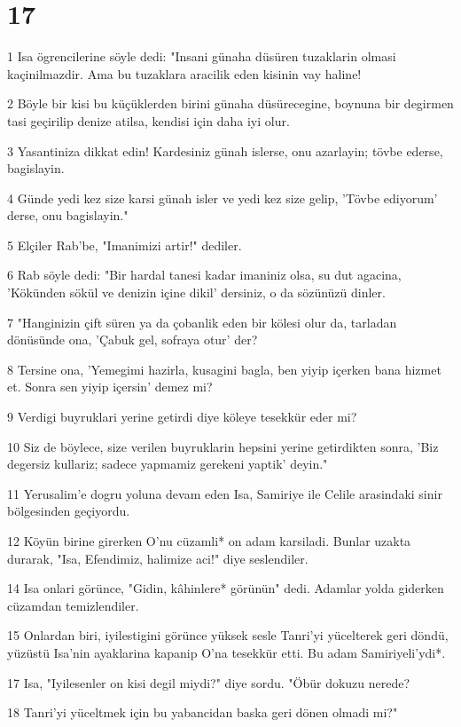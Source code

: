 \chapter{17}

\par 1 Isa ögrencilerine söyle dedi: "Insani günaha düsüren tuzaklarin olmasi kaçinilmazdir. Ama bu tuzaklara aracilik eden kisinin vay haline!
\par 2 Böyle bir kisi bu küçüklerden birini günaha düsürecegine, boynuna bir degirmen tasi geçirilip denize atilsa, kendisi için daha iyi olur.
\par 3 Yasantiniza dikkat edin! Kardesiniz günah islerse, onu azarlayin; tövbe ederse, bagislayin.
\par 4 Günde yedi kez size karsi günah isler ve yedi kez size gelip, 'Tövbe ediyorum' derse, onu bagislayin."
\par 5 Elçiler Rab'be, "Imanimizi artir!" dediler.
\par 6 Rab söyle dedi: "Bir hardal tanesi kadar imaniniz olsa, su dut agacina, 'Kökünden sökül ve denizin içine dikil' dersiniz, o da sözünüzü dinler.
\par 7 "Hanginizin çift süren ya da çobanlik eden bir kölesi olur da, tarladan dönüsünde ona, 'Çabuk gel, sofraya otur' der?
\par 8 Tersine ona, 'Yemegimi hazirla, kusagini bagla, ben yiyip içerken bana hizmet et. Sonra sen yiyip içersin' demez mi?
\par 9 Verdigi buyruklari yerine getirdi diye köleye tesekkür eder mi?
\par 10 Siz de böylece, size verilen buyruklarin hepsini yerine getirdikten sonra, 'Biz degersiz kullariz; sadece yapmamiz gerekeni yaptik' deyin."
\par 11 Yerusalim'e dogru yoluna devam eden Isa, Samiriye ile Celile arasindaki sinir bölgesinden geçiyordu.
\par 12 Köyün birine girerken O'nu cüzamli* on adam karsiladi. Bunlar uzakta durarak, "Isa, Efendimiz, halimize aci!" diye seslendiler.
\par 14 Isa onlari görünce, "Gidin, kâhinlere* görünün" dedi. Adamlar yolda giderken cüzamdan temizlendiler.
\par 15 Onlardan biri, iyilestigini görünce yüksek sesle Tanri'yi yücelterek geri döndü, yüzüstü Isa'nin ayaklarina kapanip O'na tesekkür etti. Bu adam Samiriyeli'ydi*.
\par 17 Isa, "Iyilesenler on kisi degil miydi?" diye sordu. "Öbür dokuzu nerede?
\par 18 Tanri'yi yüceltmek için bu yabancidan baska geri dönen olmadi mi?"
